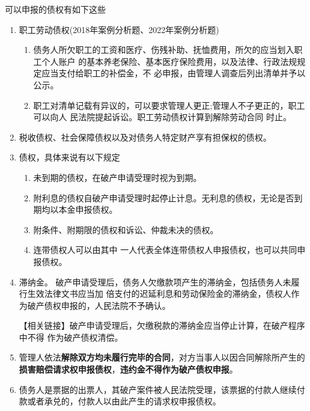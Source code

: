 \documentclass[UTF8,12pt]{ctexart}
\numberwithin{equation}{section} %
\numberwithin{figure}{section}
\numberwithin{table}{section}
\begin{document}
	可以申报的债权有如下这些
	\begin{enumerate}
		\item 职工劳动债权(2018年案例分析题、2022年案例分析题) 
		\begin{enumerate}
			\item 债务人所欠职工的工资和医疗、伤残补助、抚恤费用，所欠的应当划入职工个人账户 的基本养老保险、基本医疗保险费用，以及法律、行政法规规定应当支付给职工的补偿金，不 必申报，由管理人调查后列出清单并予以公示。
			
			\item 职工对清单记载有异议的，可以要求管理人更正;管理人不子更正的，职工可以向人 民法院提起诉讼。职工劳动债权计算到解除劳动合同 时止。
		\end{enumerate}
		
		\item 税收债权、社会保障债权以及对债务人特定财产享有担保权的债权。
		
		\item 债权，具体来说有以下规定
		\begin{enumerate}
			\item 未到期的债权，在破产申请受理时视为到期。
			
			\item 附利息的债权自破产申请受理时起停止计息。无利息的债权，无论是否到期均以本金申报债权。
			
			\item 附条件、附期限的债权和诉讼、仲裁未决的债权。
			
			\item 连带债权人可以由其中 一人代表全体连带债权人申报债权，也可以共同申报债权。
		\end{enumerate}
		
		\item 滞纳金。 破产申请受理后，债务人欠缴款项产生的滞纳金，包括债务人未履行生效法律文书应当加 倍支付的迟延利息和劳动保险金的滞纳金，债权人作为破产债权申报的，人民法院不予确认。
		
		【相关链接】破产申请受理后，欠缴税款的滞纳金应当停止计算，在破产程序中不得 作为破产债权清偿。
		
		\item 管理人依法\textbf{解除双方均未履行完毕的合同}，对方当事人以因合同解除所产生的\textbf{损害赔偿请求权申报债权}，\textbf{违约金不得作为破产债权申报}。
		
		\item 债务人是票据的出票人，其破产案件被人民法院受理，该票据的付款人继续付款或者承兑的，付款人以由此产生的请求权申报债权。
		

\end{enumerate}
\end{document}
